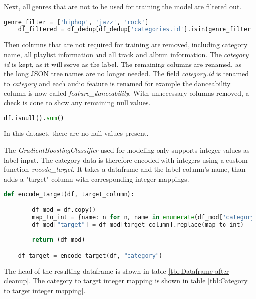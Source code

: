 Next, all genres that are not to be used for training the model are filtered out.

\begin{lstlisting}[language=Python]
    genre_filter = ['hiphop', 'jazz', 'rock']
    df_filtered = df_dedup[df_dedup['categories.id'].isin(genre_filter)]
\end{lstlisting}

Then columns that are not required for training are removed, including category name, all playlist information and
all track and album information. The \emph{category id} is kept, as it will serve as the label.
The remaining columns are renamed, as the long JSON tree names are no longer needed.
The field \emph{category.id} is renamed to \emph{category} and each audio feature is renamed for example 
the danceability column is now called \emph{feature\_danceability}.
With unnecessary columns removed, a check is done to show any remaining null values.

\begin{lstlisting}[language=Python]
    df.isnull().sum()
\end{lstlisting}

In this dataset, there are no null values present.

The \emph{GradientBoostingClassifier} used for modeling only supports integer values as label input.
The category data is therefore encoded with integers using a custom function \emph{encode\_target}.
It takes a dataframe and the label column's name, than adds a "target" column with corresponding integer mappings.

\begin{lstlisting}[language=Python]
    def encode_target(df, target_column):

        df_mod = df.copy()
        map_to_int = {name: n for n, name in enumerate(df_mod["category"].unique())}
        df_mod["target"] = df_mod[target_column].replace(map_to_int)

        return (df_mod)

    df_target = encode_target(df, "category")
\end{lstlisting}

The head of the resulting dataframe is shown in table \ref{tbl:Dataframe after cleanup}.
The category to target integer mapping is shown in table \ref{tbl:Category to target integer mapping}.

